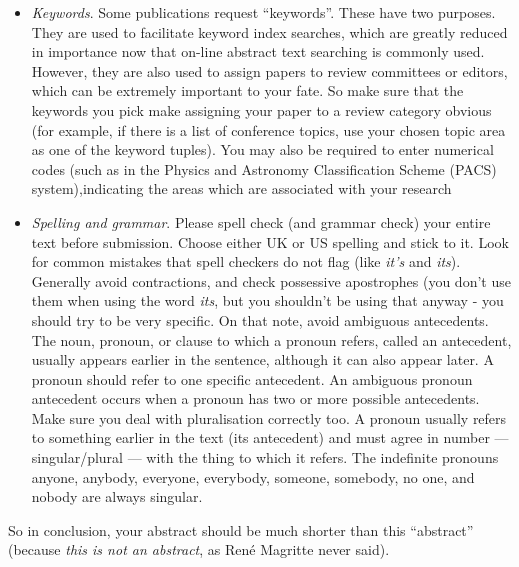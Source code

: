 \begin{itemize}
\item {\em Keywords}. Some publications request ``keywords''. These have two purposes. They are used to facilitate keyword index searches, which are greatly reduced in importance now that on-line abstract text searching is commonly used. However, they are also used to assign papers to review committees or editors, which can be extremely important to your fate. So make sure that the keywords you pick make assigning your paper to a review category obvious (for example, if there is a list of conference topics, use your chosen topic area as one of the keyword tuples). You may also be required to enter numerical codes (such as in the Physics and Astronomy Classification Scheme (PACS) system),indicating the areas which are associated with your research 
\item {\em Spelling and grammar}. Please spell check (and grammar check) your entire text before submission. Choose either UK or US spelling and stick to it. Look for common mistakes that spell checkers do not flag (like {\it it's} and {\it its}). Generally avoid contractions, and check possessive apostrophes (you don't use them when using the word {\it its}, but you shouldn't be using that anyway - you should try to be very specific. On that note, avoid ambiguous antecedents. The noun, pronoun, or clause to which a pronoun refers, called an antecedent, usually appears earlier in the sentence, although it can also appear later. A pronoun should refer to one specific antecedent. An ambiguous pronoun antecedent occurs when a pronoun has two or more possible antecedents.
Make sure you deal with pluralisation correctly too.
A pronoun usually refers to something earlier in the text (its antecedent) and must agree in number — singular/plural — with the thing to which it refers. The indefinite pronouns anyone, anybody, everyone, everybody, someone, somebody, no one, and nobody are always singular.
\end{itemize}
 
So in conclusion, your abstract should be much shorter than this ``abstract'' (because {\it this is not an abstract}, as  Ren\'e Magritte never said).


\par

